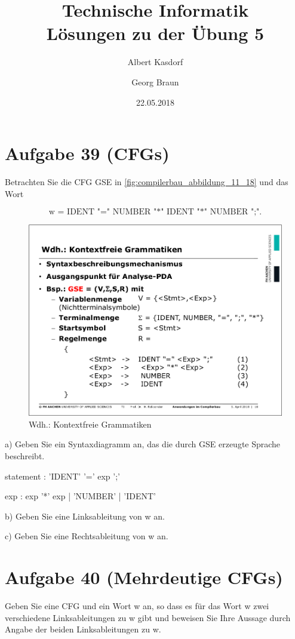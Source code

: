 \documentclass{article}
\title{Technische Informatik\\ Lösungen zu der Übung 5}
\author{
	Albert Kasdorf\and
	Georg Braun
}
\date{22.05.2018}
\begin{document}
\maketitle

\section*{Aufgabe 39 (CFGs)}
Betrachten Sie die CFG GSE in \autoref{fig:compilerbau_abbildung_11_18} und das Wort

\begin{equation*}
	\text{w = IDENT "=" NUMBER "*" IDENT "*" NUMBER ";".}
\end{equation*}

\begin{figure}[h]
	\centering
	\includegraphics[width=0.75\linewidth]{Compilerbau_Abbildung_11_18}
	\caption{Wdh.: Kontextfreie Grammatiken}
	\label{fig:compilerbau_abbildung_11_18}
\end{figure}

a) Geben Sie ein Syntaxdiagramm an, das die durch GSE erzeugte Sprache beschreibt.

\begin{rail}
	statement : 'IDENT' '=' exp ';'
\end{rail}

\begin{rail}
	exp : exp '*' exp | 'NUMBER' | 'IDENT'
\end{rail}


b) Geben Sie eine Linksableitung von w an.


c) Geben Sie eine Rechtsableitung von w an.


\section*{Aufgabe 40 (Mehrdeutige CFGs)}
Geben Sie eine CFG und ein Wort w an, so dass es für das Wort w zwei verschiedene Linksableitungen zu w gibt und beweisen Sie Ihre Aussage durch Angabe der beiden Linksableitungen zu w.
\end{document}
